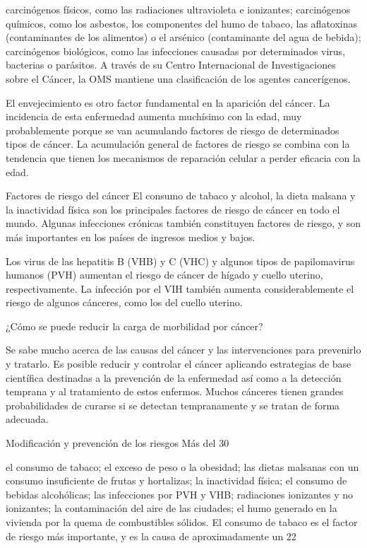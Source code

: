 \documentclass[../pfc.tex]{subfiles}
\begin{document}
carcinógenos físicos, como las radiaciones ultravioleta e ionizantes;
carcinógenos químicos, como los asbestos, los componentes del humo de tabaco, las aflatoxinas (contaminantes de los alimentos) o el arsénico (contaminante del agua de bebida);
carcinógenos biológicos, como las infecciones causadas por determinados virus, bacterias o parásitos.
A través de su Centro Internacional de Investigaciones sobre el Cáncer, la OMS mantiene una clasificación de los agentes cancerígenos.

El envejecimiento es otro factor fundamental en la aparición del cáncer. La incidencia de esta enfermedad aumenta muchísimo con la edad, muy probablemente porque se van acumulando factores de riesgo de determinados tipos de cáncer. La acumulación general de factores de riesgo se combina con la tendencia que tienen los mecanismos de reparación celular a perder eficacia con la edad.

Factores de riesgo del cáncer
El consumo de tabaco y alcohol, la dieta malsana y la inactividad física son los principales factores de riesgo de cáncer en todo el mundo. Algunas infecciones crónicas también constituyen factores de riesgo, y son más importantes en los países de ingresos medios y bajos.

Los virus de las hepatitis B (VHB) y C (VHC) y algunos tipos de papilomavirus humanos (PVH) aumentan el riesgo de cáncer de hígado y cuello uterino, respectivamente. La infección por el VIH también aumenta considerablemente el riesgo de algunos cánceres, como los del cuello uterino.

¿Cómo se puede reducir la carga de morbilidad por cáncer?

Se sabe mucho acerca de las causas del cáncer y las intervenciones para prevenirlo y tratarlo. Es posible reducir y controlar el cáncer aplicando estrategias de base científica destinadas a la prevención de la enfermedad así como a la detección temprana y al tratamiento de estos enfermos. Muchos cánceres tienen grandes probabilidades de curarse si se detectan tempranamente y se tratan de forma adecuada.

Modificación y prevención de los riesgos
Más del 30%

el consumo de tabaco;
el exceso de peso o la obesidad;
las dietas malsanas con un consumo insuficiente de frutas y hortalizas;
la inactividad física;
el consumo de bebidas alcohólicas;
las infecciones por PVH y VHB;
radiaciones ionizantes y no ionizantes;
la contaminación del aire de las ciudades;
el humo generado en la vivienda por la quema de combustibles sólidos.
El consumo de tabaco es el factor de riesgo más importante, y es la causa de aproximadamente un 22%
\end{document}
